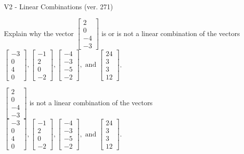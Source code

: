 \begin{exercise}
  \begin{exerciseTitle}V2 - Linear Combinations (ver. 271)\end{exerciseTitle}
  \begin{exerciseStatement}
    Explain why the vector \(\left[\begin{array}{c}
2 \\
0 \\
-4 \\
-3
\end{array}\right]\)  is or is not a linear 
	combination of the vectors \(\left[\begin{array}{c}
-3 \\
0 \\
4 \\
0
\end{array}\right] , \left[\begin{array}{c}
-1 \\
2 \\
0 \\
-2
\end{array}\right] , \left[\begin{array}{c}
-4 \\
-3 \\
-5 \\
-2
\end{array}\right] , \text{ and } \left[\begin{array}{c}
24 \\
3 \\
3 \\
12
\end{array}\right]\).
	


  \end{exerciseStatement}
  \begin{exerciseAnswer}
   \(\left[\begin{array}{c}
2 \\
0 \\
-4 \\
-3
\end{array}\right]\) 
  	 is not  
	a linear combination of the vectors \(\left[\begin{array}{c}
-3 \\
0 \\
4 \\
0
\end{array}\right] , \left[\begin{array}{c}
-1 \\
2 \\
0 \\
-2
\end{array}\right] , \left[\begin{array}{c}
-4 \\
-3 \\
-5 \\
-2
\end{array}\right] , \text{ and } \left[\begin{array}{c}
24 \\
3 \\
3 \\
12
\end{array}\right]\).


\end{exerciseAnswer}
\end{exercise}
